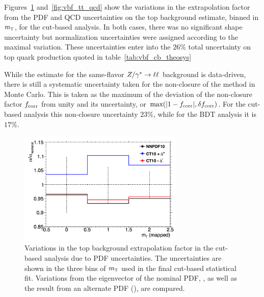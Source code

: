 Figures~\ref{fig:vbf_tt_pdf} and~\ref{fig:vbf_tt_qcd} show the variations in the extrapolation factor from the PDF and QCD uncertainties on the top background estimate, binned in $m_{\textrm{\footnotesize\sc t}}$, for the cut-based analysis. In both cases, there was no significant shape uncertainty but normalization uncertainties were assigned according to the maximal variation. These uncertainties enter into the $26\%$ total uncertainty on top quark production quoted in table~\ref{tab:vbf_cb_theosys}

While the estimate for the same-flavor $Z/\gamma^{\ast}\to\ell\ell$ background is data-driven, there is still a systematic uncertainty taken for the non-closure of the method in Monte Carlo. This is taken as the maximum of the deviation of the non-closure factor $f_{\rm corr}$ from unity and its uncertainty, or $\textrm{max}(|1 - f_{\rm corr}|, \delta f_{\rm corr})$. For the cut-based analysis this non-closure uncertainty $23$\%, while for the BDT analysis it is $17\%$.

\begin{figure}[h!]
  \centering
  \captionsetup{justification=centering}
  \includegraphics[width=0.7\textwidth]{figures/VBF_cb_tt_pdf}
  \caption{Variations in the top background extrapolation factor in the cut-based analysis due to PDF uncertainties. The uncertainties are shown in the three bins of $m_{\textrm{\footnotesize\sc t}}$ used in the final cut-based statistical fit. Variations from the eigenvector of the nominal PDF, , as well as the result from an alternate PDF (), are compared.}
  \label{fig:vbf_tt_pdf}
\end{figure}


